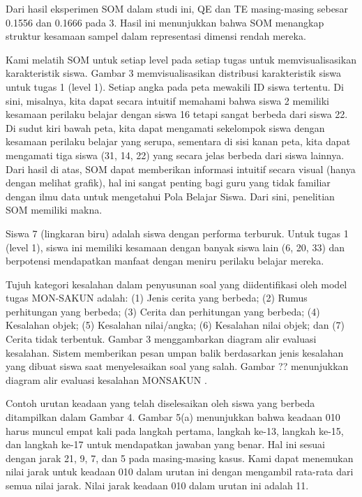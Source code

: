     Dari hasil eksperimen SOM dalam studi ini, QE dan TE masing-masing sebesar 0.1556 dan 0.1666 pada 3. Hasil ini menunjukkan bahwa SOM menangkap struktur kesamaan sampel dalam representasi dimensi rendah mereka.
        
    Kami melatih SOM untuk setiap level pada setiap tugas untuk memvisualisasikan karakteristik siswa. Gambar 3 memvisualisasikan distribusi karakteristik siswa untuk tugas 1 (level 1). Setiap angka pada peta mewakili ID siswa tertentu. Di sini, misalnya, kita dapat secara intuitif memahami bahwa siswa 2 memiliki kesamaan perilaku belajar dengan siswa 16 tetapi sangat berbeda dari siswa 22. Di sudut kiri bawah peta, kita dapat mengamati sekelompok siswa dengan kesamaan perilaku belajar yang serupa, sementara di sisi kanan peta, kita dapat mengamati tiga siswa (31, 14, 22) yang secara jelas berbeda dari siswa lainnya. Dari hasil di atas, SOM dapat memberikan informasi intuitif secara visual (hanya dengan melihat grafik), hal ini sangat penting bagi guru yang tidak familiar dengan ilmu data untuk mengetahui Pola Belajar Siswa. Dari sini, penelitian SOM memiliki makna.
    
    Siswa 7 (lingkaran biru) adalah siswa dengan performa terburuk. Untuk tugas 1 (level 1), siswa ini memiliki kesamaan dengan banyak siswa lain (6, 20, 33) dan berpotensi mendapatkan manfaat dengan meniru perilaku belajar mereka.
    
    Tujuh kategori kesalahan dalam penyusunan soal yang diidentifikasi oleh model tugas MON-SAKUN adalah: (1) Jenis cerita yang berbeda; (2) Rumus perhitungan yang berbeda; (3) Cerita dan perhitungan yang berbeda; (4) Kesalahan objek; (5) Kesalahan nilai/angka; (6) Kesalahan nilai objek; dan (7) Cerita tidak terbentuk. Gambar 3 menggambarkan diagram alir evaluasi kesalahan. Sistem memberikan pesan umpan balik berdasarkan jenis kesalahan yang dibuat siswa saat menyelesaikan soal yang salah. Gambar ?? menunjukkan diagram alir evaluasi kesalahan MONSAKUN \citep{Supianto2017}.
    
    Contoh urutan keadaan yang telah diselesaikan oleh siswa yang berbeda ditampilkan dalam Gambar 4. Gambar 5(a) menunjukkan bahwa keadaan 010 harus muncul empat kali pada langkah pertama, langkah ke-13, langkah ke-15, dan langkah ke-17 untuk mendapatkan jawaban yang benar. Hal ini sesuai dengan jarak 21, 9, 7, dan 5 pada masing-masing kasus. Kami dapat menemukan nilai jarak untuk keadaan 010 dalam urutan ini dengan mengambil rata-rata dari semua nilai jarak. Nilai jarak keadaan 010 dalam urutan ini adalah 11.

